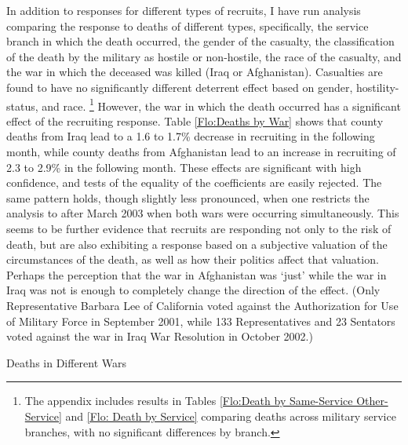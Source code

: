\documentclass[12pt] {article}
\begin{document}
In addition to responses for different types of recruits, I have run analysis comparing the response to deaths of different types, specifically, the service branch in which the death occurred, the gender of the casualty, the classification of the death by the military as hostile or non-hostile, the race of
the casualty, and the war in which the deceased was killed (Iraq or
Afghanistan). Casualties are found to have no significantly different
deterrent effect based on gender, hostility-status, and race.%
\footnote{%
The appendix includes results in Tables \ref{Flo:Death by Same-Service Other-Service} and \ref{Flo: Death by Service} comparing deaths across military service branches, with no significant differences by branch.} 
However, the war in which the death occurred has a significant effect of the recruiting response. Table \ref{Flo:Deaths by War} shows that county deaths from Iraq lead to a 1.6 to 1.7\% decrease in recruiting in the following month, while county deaths from Afghanistan lead to an increase in recruiting of 2.3 to 2.9\% in the following month. 
These effects are significant with high confidence, and tests of the
equality of the coefficients are easily rejected. The same pattern holds, though slightly less pronounced, when one restricts the analysis to after March 2003 when both wars were occurring simultaneously. This seems to be further evidence that recruits are responding not only to the risk of death, but are also exhibiting a response based on a subjective valuation of the circumstances of the death, as well as how their politics affect that valuation. Perhaps the perception that the war in Afghanistan was `just' while the war in Iraq was not is enough to completely change the direction of the effect. (Only Representative Barbara Lee of California voted against the Authorization for Use of Military Force in September 2001, while 133 Representatives and 23 Sentators voted against the war in Iraq War Resolution in October 2002.)
\begin{table}
\caption{Deaths in Different Wars}
\label{Flo:Deaths by WarLN}

\end{table}
\end{document}
